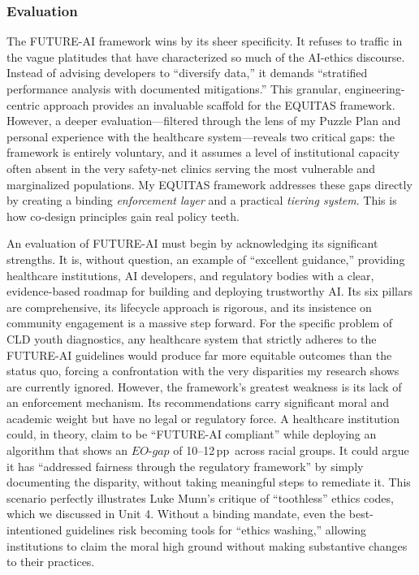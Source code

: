 \documentclass[11pt,twoside]{article}
\DeclareRobustCommand{\EOgap}{EO\text{-}gap\xspace}
\DeclareRobustCommand{\pp}{pp\xspace} %
\begin{document}
\newpage
\vspace{-0.3cm}
\subsubsection*{Evaluation}

\vspace{-0.3cm}
The FUTURE-AI framework wins by its sheer specificity. It refuses to traffic in the vague platitudes that have characterized so much of the AI-ethics discourse. Instead of advising developers to “diversify data,” it demands “stratified performance analysis with documented mitigations.” This granular, engineering-centric approach provides an invaluable scaffold for the \textsc{EQUITAS} framework. However, a deeper evaluation—filtered through the lens of my Puzzle Plan and personal experience with the healthcare system—reveals two critical gaps: the framework is entirely voluntary, and it assumes a level of institutional capacity often absent in the very safety-net clinics serving the most vulnerable and marginalized populations. My \textsc{EQUITAS} framework addresses these gaps directly by creating a binding \textit{enforcement layer} and a practical \textit{tiering system}. This is how co-design principles gain real policy teeth.

An evaluation of FUTURE-AI must begin by acknowledging its significant strengths. It is, without question, an example of “excellent guidance,” providing healthcare institutions, AI developers, and regulatory bodies with a clear, evidence-based roadmap for building and deploying trustworthy AI. Its six pillars are comprehensive, its lifecycle approach is rigorous, and its insistence on community engagement is a massive step forward. For the specific problem of CLD youth diagnostics, any healthcare system that strictly adheres to the FUTURE-AI guidelines would produce far more equitable outcomes than the status quo, forcing a confrontation with the very disparities my research shows are currently ignored. However, the framework’s greatest weakness is its lack of an enforcement mechanism. Its recommendations carry significant moral and academic weight but have no legal or regulatory force. A healthcare institution could, in theory, claim to be “FUTURE-AI compliant” while deploying an algorithm that shows an $\EOgap$ of 10–12\,\pp\ across racial groups. It could argue it has “addressed fairness through the regulatory framework” by simply documenting the disparity, without taking meaningful steps to remediate it. This scenario perfectly illustrates Luke Munn’s critique of “toothless” ethics codes, which we discussed in Unit 4. Without a binding mandate, even the best-intentioned guidelines risk becoming tools for “ethics washing,” allowing institutions to claim the moral high ground without making substantive changes to their practices.
\end{document}
